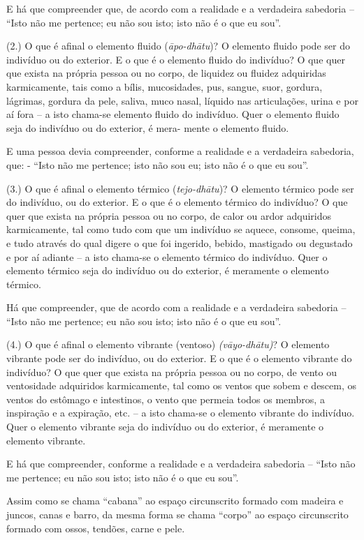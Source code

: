 E há que compreender que, de acordo com a realidade e a verdadeira sabedoria --
``Isto não me pertence; eu não sou isto; isto não é o que eu sou''.

(2.) O que é afinal o elemento fluido (\emph{āpo-dhātu})? O elemento fluido pode
ser do indivíduo ou do exterior. E o que é o elemento fluido do indivíduo? O que
quer que exista na própria pessoa ou no corpo, de liquidez ou fluidez adquiridas
karmicamente, tais como a bílis, mucosidades, pus, sangue, suor, gordura,
lágrimas, gordura da pele, saliva, muco nasal, líquido nas articulações, urina e
por aí fora -- a isto chama-se elemento fluido do indivíduo. Quer o elemento
fluido seja do indivíduo ou do exterior, é mera- mente o elemento fluido.

E uma pessoa devia compreender, conforme a realidade e a verdadeira sabedoria,
que: - ``Isto não me pertence; isto não sou eu; isto não é o que eu sou''.

(3.) O que é afinal o elemento térmico (\emph{tejo-dhātu})? O elemento térmico
pode ser do indivíduo, ou do exterior. E o que é o elemento térmico do
indivíduo? O que quer que exista na própria pessoa ou no corpo, de calor ou
ardor adquiridos karmicamente, tal como tudo com que um indivíduo se aquece,
consome, queima, e tudo através do qual digere o que foi ingerido, bebido,
mastigado ou degustado e por aí adiante -- a isto chama-se o elemento térmico do
indivíduo. Quer o elemento térmico seja do indivíduo ou do exterior, é meramente
o elemento térmico.

Há que compreender, que de acordo com a realidade e a verdadeira sabedoria --
``Isto não me pertence; eu não sou isto; isto não é o que eu sou''.

(4.) O que é afinal o elemento vibrante (ventoso) \emph{(vāyo-dhātu)}? O
elemento vibrante pode ser do indivíduo, ou do exterior. E o que é o elemento
vibrante do indivíduo? O que quer que exista na própria pessoa ou no corpo, de
vento ou ventosidade adquiridos karmicamente, tal como os ventos que sobem e
descem, os ventos do estômago e intestinos, o vento que permeia todos os
membros, a inspiração e a expiração, etc. -- a isto chama-se o elemento vibrante
do indivíduo. Quer o elemento vibrante seja do indivíduo ou do exterior, é
meramente o elemento vibrante.

E há que compreender, conforme a realidade e a verdadeira sabedoria -- ``Isto
não me pertence; eu não sou isto; isto não é o que eu sou''.

Assim como se chama ``cabana'' ao espaço circunscrito formado com madeira e
juncos, canas e barro, da mesma forma se chama ``corpo'' ao espaço circunscrito
formado com ossos, tendões, carne e pele.

